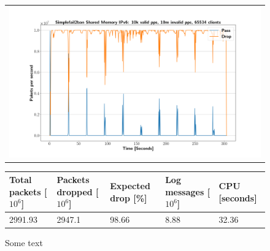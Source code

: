 \begin{figure}[p]
	\label{fig:simplefail2ban:shm:ip6:10m}
	\centering
	\scriptsize
	\begin{tabular}{c}
    	\centerline{\includegraphics[width=1.2\textwidth]{images/simplefail2ban_shm_ipv6_v10k_iv10m_c65534.png}}
	\end{tabular}
	\begin{tabular}{lllll}
		\toprule
		\textbf{Total packets [$10^6$]} & \textbf{Packets dropped [$10^6$]} & \textbf{Expected drop [\%]} & \textbf{Log messages [$10^6$]} & \textbf{CPU [seconds]} \\ \midrule 
		2991.93 & 2947.1 & 98.66 & 8.88 & 32.36 \\
		\bottomrule
	\end{tabular}
	\caption[Simplefail2ban Shared Memory IPv6 10m PPS]{Some text}
\end{figure}

